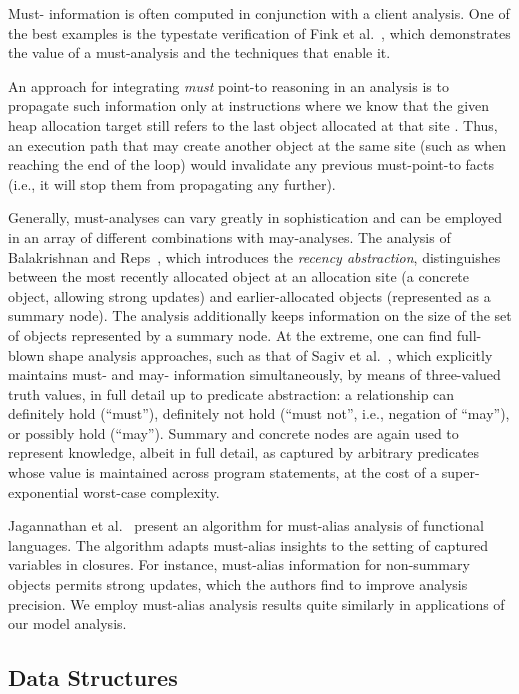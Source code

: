 Must- information is often computed in conjunction with a client analysis. One of the best examples is the typestate verification of Fink et al.~\cite{issta:2006:Fink}, which demonstrates the value of a must-analysis and the techniques that enable it.

An approach for integrating \emph{must} point-to reasoning in an analysis is to propagate such information only at instructions where we know that the given heap allocation target still refers to the last object allocated at that site \cite{popl:1995:Altucher}. Thus, an execution path that may create another object at the same site (such as when reaching the end of the loop) would invalidate any previous must-point-to facts (i.e., it will stop them from propagating any further).

Generally, must-analyses can vary greatly in sophistication and can be employed in an array of different combinations with may-analyses. The analysis of Balakrishnan and Reps~\cite{sas:2006:Balakrishnan}, which introduces the \emph{recency abstraction}, distinguishes between the most recently allocated object at an allocation site (a concrete object, allowing strong updates) and earlier-allocated objects (represented as a summary node). The analysis additionally keeps information on the size of the set of objects represented by a summary node. At the extreme, one can find full-blown shape analysis approaches, such as that of Sagiv et al.~\cite{article:2002:Sagiv}, which explicitly maintains must- and may- information simultaneously, by means of three-valued truth values, in full detail up to predicate abstraction: a relationship can definitely hold (``must''), definitely not hold (``must not'', i.e., negation of ``may''), or possibly hold (``may''). Summary and concrete nodes are again used to represent knowledge, albeit in full detail, as captured by arbitrary predicates whose value is maintained across program statements, at the cost of a super-exponential worst-case complexity.

Jagannathan et al.~\cite{popl:1998:Jagannathan} present an algorithm for must-alias analysis of functional languages. The algorithm adapts must-alias insights to the setting of captured variables in closures. For instance, must-alias information for non-summary objects permits strong updates, which the authors find to improve analysis precision. We employ must-alias analysis results quite similarly in applications of our model analysis.


\subsection*{Data Structures}

